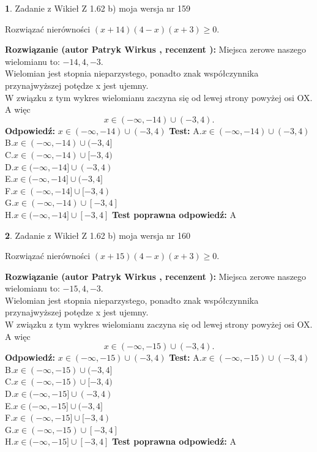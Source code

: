 \documentclass[12pt, a4paper]{article}
\theoremstyle{definition} %
\newtheorem{zad}{}
\newcommand{\zadStart}[1]{\begin{zad}#1\newline}
\newcommand{\zadStop}{\end{zad}}
\newcommand{\rozwStart}[2]{\noindent \textbf{Rozwiązanie (autor #1 , recenzent #2): }\newline}
\newcommand{\rozwStop}{\newline}
\newcommand{\odpStart}{\noindent \textbf{Odpowiedź:}\newline}
\newcommand{\odpStop}{\newline}
\newcommand{\testStart}{\noindent \textbf{Test:}\newline}
\newcommand{\testStop}{\newline}
\newcommand{\kluczStart}{\noindent \textbf{Test poprawna odpowiedź:}\newline}
\newcommand{\kluczStop}{\newline}
\begin{document}
\zadStart{Zadanie z Wikieł Z 1.62 b) moja wersja nr 159}

Rozwiązać nierówności $(x+14)(4-x)(x+3)\ge0$.
\zadStop
\rozwStart{Patryk Wirkus}{}
Miejsca zerowe naszego wielomianu to: $-14, 4, -3$.\\
Wielomian jest stopnia nieparzystego, ponadto znak współczynnika przy\linebreak najwyższej potędze x jest ujemny.\\ W związku z tym wykres wielomianu zaczyna się od lewej strony powyżej osi OX. A więc $$x \in (-\infty,-14) \cup (-3,4).$$
\rozwStop
\odpStart
$x \in (-\infty,-14) \cup (-3,4)$
\odpStop
\testStart
A.$x \in (-\infty,-14) \cup (-3,4)$\\
B.$x \in (-\infty,-14) \cup (-3,4]$\\
C.$x \in (-\infty,-14) \cup [-3,4)$\\
D.$x \in (-\infty,-14] \cup (-3,4)$\\
E.$x \in (-\infty,-14] \cup (-3,4]$\\
F.$x \in (-\infty,-14] \cup [-3,4)$\\
G.$x \in (-\infty,-14) \cup [-3,4]$\\
H.$x \in (-\infty,-14] \cup [-3,4]$
\testStop
\kluczStart
A
\kluczStop



\zadStart{Zadanie z Wikieł Z 1.62 b) moja wersja nr 160}

Rozwiązać nierówności $(x+15)(4-x)(x+3)\ge0$.
\zadStop
\rozwStart{Patryk Wirkus}{}
Miejsca zerowe naszego wielomianu to: $-15, 4, -3$.\\
Wielomian jest stopnia nieparzystego, ponadto znak współczynnika przy\linebreak najwyższej potędze x jest ujemny.\\ W związku z tym wykres wielomianu zaczyna się od lewej strony powyżej osi OX. A więc $$x \in (-\infty,-15) \cup (-3,4).$$
\rozwStop
\odpStart
$x \in (-\infty,-15) \cup (-3,4)$
\odpStop
\testStart
A.$x \in (-\infty,-15) \cup (-3,4)$\\
B.$x \in (-\infty,-15) \cup (-3,4]$\\
C.$x \in (-\infty,-15) \cup [-3,4)$\\
D.$x \in (-\infty,-15] \cup (-3,4)$\\
E.$x \in (-\infty,-15] \cup (-3,4]$\\
F.$x \in (-\infty,-15] \cup [-3,4)$\\
G.$x \in (-\infty,-15) \cup [-3,4]$\\
H.$x \in (-\infty,-15] \cup [-3,4]$
\testStop
\kluczStart
A
\kluczStop
\end{document}
